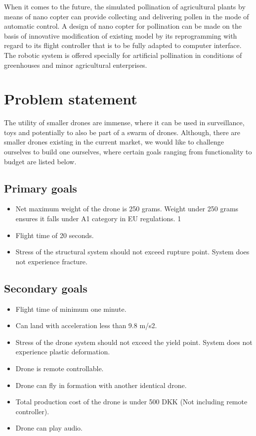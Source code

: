 \documentclass[a4paper,11pt]{article}
\begin{document}
When it comes to the future, the simulated pollination of agricultural plants by means of nano copter can provide collecting and delivering pollen in the mode of automatic control. A design of nano copter for pollination can be made on the basis of innovative modification of existing model by its reprogramming with regard to its flight controller that is to be fully adapted to computer interface. The robotic system is offered specially for artificial pollination in conditions of greenhouses and minor agricultural enterprises. \cite{Abutalipov2016}

 
\section{Problem statement}

The utility of smaller drones are immense, where it can be used in surveillance, toys and potentially to also be part of a swarm of drones. Although, there are smaller drones existing in the current market, we would like to challenge ourselves to build one ourselves, where certain goals ranging from functionality to budget are listed below. 


\subsection{Primary goals }
\begin{itemize}
    \item 
    Net maximum weight of the drone is 250 grams. Weight under 250 grams ensures it falls under A1 category in EU regulations. 1 
    \item
    Flight time of 20 seconds.
    \item
    Stress of the structural system should not exceed rupture point. System does not experience fracture. 
\end{itemize}


\subsection{Secondary goals}
\begin{itemize}
    \item 
    Flight time of minimum one minute. 
    \item
    Can land with acceleration less than 9.8 m/s2.
    \item
    Stress of the drone system should not exceed the yield point. System does not experience plastic deformation. 
    \item
    Drone is remote controllable. 
    \item
    Drone can fly in formation with another identical drone.
    \item
    Total production cost of the drone is under 500 DKK (Not including remote controller). 
    \item
    Drone can play audio.
\end{itemize}
\end{document}
